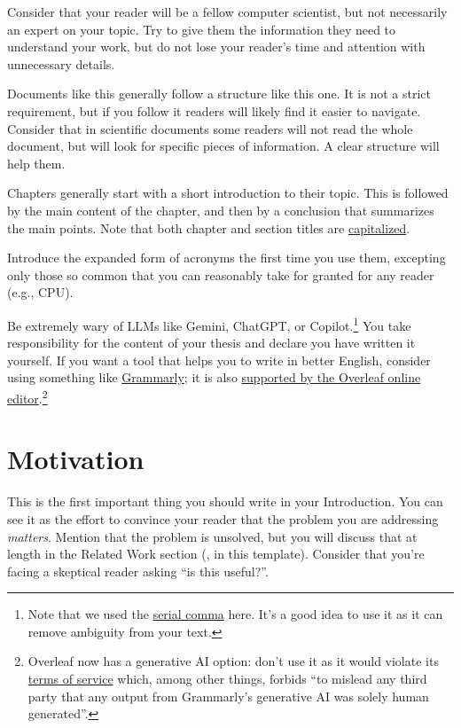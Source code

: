 Consider that your reader will be a fellow computer scientist, but not necessarily an expert
on your topic. Try to give them the information they need to understand your work, but
do not lose your reader's time and attention with unnecessary details.

Documents like this generally follow a structure like this one. It is not a strict
requirement, but if you follow it readers will likely find it easier to navigate.
Consider that in scientific documents some readers will not read the whole document,
but will look for specific pieces of information. A clear structure will help them.

Chapters generally start with a short introduction to their topic. This is followed by the main content of the chapter, and then by a conclusion
that summarizes the main points. Note that both chapter and section titles are
\href{https://www.grammarly.com/blog/capitalization-in-the-titles/}{capitalized}.

Introduce the expanded form of acronyms the first time you use them, excepting only those so common that you can reasonably take for granted for any reader (e.g., CPU).

Be extremely wary of \acp{LLM} like Gemini, ChatGPT, or
Copilot.\footnote{Note that we used the \href{https://en.wikipedia.org/wiki/Serial_comma}{serial comma} here. It's a good idea to use it as it can remove ambiguity from your text.} You take
responsibility for the content of your thesis and declare you have written it yourself.
If you want a tool that helps you to write in better English, consider using something like
\href{https://grammarly.com}{Grammarly}; it is also \href{https://www.overleaf.com/learn/how-to/Use_Grammarly_with_Overleaf}{supported by the Overleaf online \latex editor}.\footnote{Overleaf now has a generative AI option: don't use it as it would violate its \href{https://www.grammarly.com/terms}{terms of service} which, among other things, forbids ``to mislead any third party that any output from Grammarly’s generative AI was solely human generated''.}

\section{Motivation}

This is the first important thing you should write in your Introduction.
You can see it as the effort to convince your reader that the problem you are addressing
\emph{matters}. Mention that the problem is unsolved, but you will discuss that at
length in the Related Work section (, in this template). Consider that
you're facing a skeptical reader asking ``is this useful?''.

